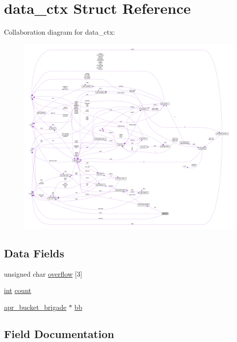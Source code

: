 \hypertarget{structdata__ctx}{}\section{data\+\_\+ctx Struct Reference}
\label{structdata__ctx}


Collaboration diagram for data\+\_\+ctx\+:
\nopagebreak
\begin{figure}[H]
\begin{center}
\leavevmode
\includegraphics[width=350pt]{structdata__ctx__coll__graph}
\end{center}
\end{figure}
\subsection*{Data Fields}
\begin{DoxyCompactItemize}
\item 
unsigned char \hyperlink{structdata__ctx_a61fe22719d2f6788e27738479a82dddc}{overflow} \mbox{[}3\mbox{]}
\item 
\hyperlink{pcre_8txt_a42dfa4ff673c82d8efe7144098fbc198}{int} \hyperlink{structdata__ctx_ab31db25a982c93f8eb8d7538ccc29020}{count}
\item 
\hyperlink{structapr__bucket__brigade}{apr\+\_\+bucket\+\_\+brigade} $\ast$ \hyperlink{structdata__ctx_a00ef0d55fca6a3e3145f68492f6d9ad6}{bb}
\end{DoxyCompactItemize}


\subsection{Field Documentation}
